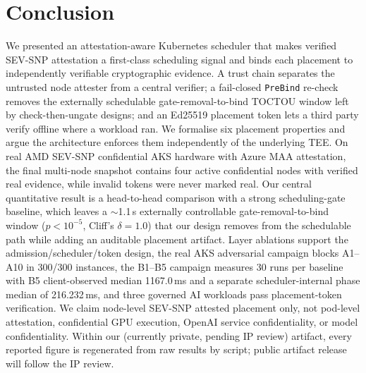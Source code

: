 \section{Conclusion}
\label{sec:conclusion}

We presented an attestation-aware Kubernetes scheduler that makes verified
SEV-SNP attestation a first-class scheduling signal and binds each placement to
independently verifiable cryptographic evidence. A trust chain separates the
untrusted node attester from a central verifier; a fail-closed \texttt{PreBind}
re-check removes the externally schedulable gate-removal-to-bind TOCTOU window
left by check-then-ungate designs; and an Ed25519 placement token lets a third
party verify offline where a workload ran. We formalise six placement properties
and argue the architecture enforces them independently of the underlying TEE. On
real AMD SEV-SNP confidential AKS hardware with Azure MAA attestation, the final
multi-node snapshot contains four active confidential nodes with verified real
evidence, while invalid tokens were never marked real. Our central quantitative
result is a head-to-head comparison with a strong scheduling-gate baseline, which
leaves a $\sim$1.1\,s externally controllable gate-removal-to-bind window
($p<10^{-5}$, Cliff's $\delta{=}1.0$) that our design removes from the schedulable
path while adding an auditable placement artifact. Layer ablations support the
admission/scheduler/token design, the real AKS adversarial campaign blocks
A1--A10 in 300/300 instances, the B1--B5 campaign measures 30 runs per baseline
with B5 client-observed median 1167.0\,ms and a separate scheduler-internal
phase median of 216.232\,ms, and three governed AI workloads pass
placement-token verification. We claim node-level SEV-SNP attested
placement only, not pod-level attestation, confidential GPU execution, OpenAI
service confidentiality, or model confidentiality. Within our (currently private,
pending IP review) artifact, every reported figure is regenerated from raw
results by script; public artifact release will follow the IP review.
